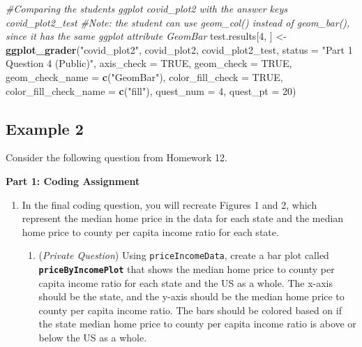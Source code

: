 \documentclass[
  12pt,
]{book}
\newenvironment{Shaded}{\begin{snugshade}}{\end{snugshade}}
\newcommand{\AttributeTok}[1]{\textcolor[rgb]{0.13,0.29,0.53}{#1}}
\newcommand{\CommentTok}[1]{\textcolor[rgb]{0.56,0.35,0.01}{\textit{#1}}}
\newcommand{\ConstantTok}[1]{\textcolor[rgb]{0.56,0.35,0.01}{#1}}
\newcommand{\DecValTok}[1]{\textcolor[rgb]{0.00,0.00,0.81}{#1}}
\newcommand{\FunctionTok}[1]{\textcolor[rgb]{0.13,0.29,0.53}{\textbf{#1}}}
\newcommand{\NormalTok}[1]{#1}
\newcommand{\OtherTok}[1]{\textcolor[rgb]{0.56,0.35,0.01}{#1}}
\newcommand{\StringTok}[1]{\textcolor[rgb]{0.31,0.60,0.02}{#1}}
\providecommand{\tightlist}{%
  \setlength{\itemsep}{0pt}\setlength{\parskip}{0pt}}
\begin{document}
\begin{Shaded}
\begin{Highlighting}[]
\CommentTok{\#Comparing the student\textquotesingle{}s ggplot \textasciigrave{}covid\_plot2\textasciigrave{} with the answer key\textquotesingle{}s \textasciigrave{}covid\_plot2\_test\textasciigrave{} }
\CommentTok{\#Note: the student can use \textasciigrave{}geom\_col()\textasciigrave{} instead of \textasciigrave{}geom\_bar()\textasciigrave{}, since it has the same ggplot attribute \textasciigrave{}GeomBar\textasciigrave{}}
\NormalTok{test.results[}\DecValTok{4}\NormalTok{, ] }\OtherTok{\textless{}{-}} \FunctionTok{ggplot\_grader}\NormalTok{(}\StringTok{"covid\_plot2"}\NormalTok{, covid\_plot2, covid\_plot2\_test, }
                                   \AttributeTok{status =} \StringTok{"Part 1 Question 4 (Public)"}\NormalTok{, }\AttributeTok{axis\_check =} \ConstantTok{TRUE}\NormalTok{, }
                                   \AttributeTok{geom\_check =} \ConstantTok{TRUE}\NormalTok{, }\AttributeTok{geom\_check\_name =} \FunctionTok{c}\NormalTok{(}\StringTok{"GeomBar"}\NormalTok{), }
                                   \AttributeTok{color\_fill\_check =} \ConstantTok{TRUE}\NormalTok{, }\AttributeTok{color\_fill\_check\_name =} \FunctionTok{c}\NormalTok{(}\StringTok{"fill"}\NormalTok{),}
                                   \AttributeTok{quest\_num =} \DecValTok{4}\NormalTok{, }\AttributeTok{quest\_pt =} \DecValTok{20}\NormalTok{)}
\end{Highlighting}
\end{Shaded}

\subsection*{Example 2}\label{example-2}

Consider the following question from Homework 12.

\textbf{Part 1: Coding Assignment}

\begin{enumerate}
\def\labelenumi{\arabic{enumi}.}
\setcounter{enumi}{3}
\item
  In the final coding question, you will recreate Figures 1 and 2, which represent the median home price in the data for each state and the median home price to county per capita income ratio for each state.

  \begin{enumerate}
  \def\labelenumii{\alph{enumii})}
  \setcounter{enumii}{2}
  \tightlist
  \item
    (\emph{Private Question}) Using \texttt{priceIncomeData}, create a bar plot called \textbf{\texttt{priceByIncomePlot}} that shows the median home price to county per capita income ratio for each state and the US as a whole. The x-axis should be the state, and the y-axis should be the median home price to county per capita income ratio. The bars should be colored based on if the state median home price to county per capita income ratio is above or below the US as a whole.
  \end{enumerate}
\end{enumerate}
\end{document}
